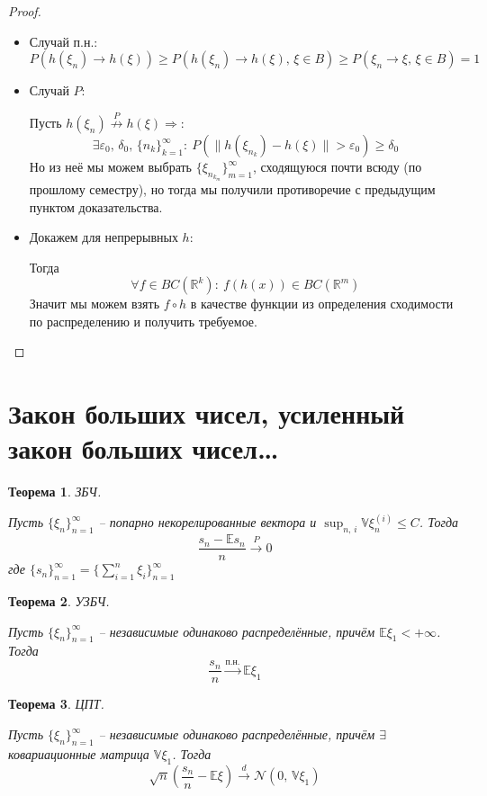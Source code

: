 \documentclass[a4paper,12pt]{article}
\renewcommand{\leq}{\ensuremath{\leqslant}}
\renewcommand{\geq}{\ensuremath{\geqslant}}
\theoremstyle{plain}
\newtheorem{theorem}{Теорема}[section]
\theoremstyle{definition}
\theoremstyle{remark}
\begin{document}
\begin{proof}
  \begin{itemize}
    \item Случай п.н.:
    \[
      P(h(\xi_n) \to h(\xi)) \geq P(h(\xi_n) \to h(\xi),\, \xi \in B) \geq P(\xi_n \to \xi,\, \xi \in B) = 1
    \]
    \item Случай $P$:
    
    Пусть $h(\xi_n) \overset{P}{\not\to} h(\xi) \Rightarrow$:
    \[
      \exists \varepsilon_0,\,\delta_0,\, \{n_k\}_{k = 1}^\infty :\: P(\|h(\xi_{n_k}) - h(\xi)\| > \varepsilon_0) \geq \delta_0
    \]
    Но из неё мы можем выбрать $\{\xi_{n_{k_m}}\}_{m = 1}^\infty$, сходящуюся почти всюду (по прошлому семестру), но тогда мы получили противоречие с предыдущим пунктом доказательства.
    \item Докажем для непрерывных $h$:
    
    Тогда \[
      \forall f \in BC(\mathbb{R}^k) :\: f(h(x)) \in BC(\mathbb{R}^m)
    \]
    Значит мы можем взять $f \circ h$ в качестве функции из определения сходимости по распределению и получить требуемое.
  \end{itemize}
\end{proof}

\section{Закон больших чисел, усиленный закон больших чисел\dots}
\begin{theorem}
  ЗБЧ.

  Пусть $\{\xi_n\}_{n = 1}^\infty$ -- попарно некорелированные вектора и $\sup_{n,\, i} \mathbb{V}\xi_n^{(i)} \leq C$. Тогда
  \[
    \frac{s_n - \mathbb{E}s_n}{n} \overset{P}{\to} 0
  \]
  где $\{s_n\}_{n = 1}^\infty = \{\sum_{i = 1}^n \xi_i\}_{n = 1}^\infty$
\end{theorem}

\begin{theorem}
  УЗБЧ.

  Пусть $\{\xi_n\}_{n = 1}^\infty$ -- независимые одинаково распределённые, причём $\mathbb{E}\xi_1 < +\infty$. Тогда
  \[
    \frac{s_n}{n} \overset{\text{п.н.}}{\to} \mathbb{E}\xi_1
  \]
\end{theorem}

\begin{theorem}
  ЦПТ.

  Пусть $\{\xi_n\}_{n = 1}^\infty$ -- независимые одинаково распределённые, причём $\exists$ ковариационные матрица $\mathbb{V}\xi_1$. Тогда
  \[
    \sqrt{n}\left(\frac{s_n}{n} - \mathbb{E}\xi\right) \overset{d}{\to} \mathcal{N}(0,\, \mathbb{V}\xi_1)
  \]
\end{theorem}
\end{document}
